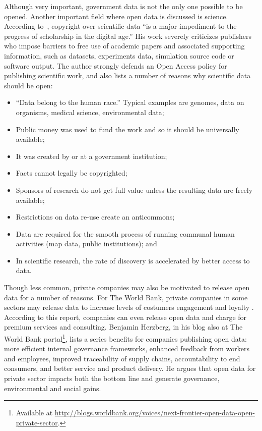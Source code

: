 Although very important, government data is not the only one possible to be opened.
Another important field where open data is discussed is science.
According to~, copyright over scientific data ``is a major impediment to the progress of scholarship in the digital age.''
His work severely criticizes publishers who impose barriers to free use of academic papers and associated supporting information, such as datasets, experiments data, simulation source code or software output.
The author strongly defends an Open Access policy for publishing scientific work, and also lists a number of reasons why scientific data should be open:

\begin{itemize}
	\item  ``Data belong to the human race.'' Typical examples are genomes, data on organisms, medical science, environmental data;
	\item Public money was used to fund the work and so it should be universally available;
	\item It was created by or at a government institution;
	\item Facts cannot legally be copyrighted;
	\item Sponsors of research do not get full value unless the resulting data are freely available;
	\item Restrictions on data re-use create an anticommons;
	\item Data are required for the smooth process of running communal human activities (map data, public institutions); and
	\item In scientific research, the rate of discovery is accelerated by better access to data.
\end{itemize}

Though less common, private companies may also be motivated to release open data for a number of reasons.
For The World Bank, private companies in some sectors may release data to increase levels of costumers engagement and loyalty \cite{TheWorldBank2014}.
According to this report, companies can even release open data and charge for premium services and consulting.
Benjamin Herzberg, in his blog also at The World Bank portal\footnote{Available at \url{http://blogs.worldbank.org/voices/next-frontier-open-data-open-private-sector}.}, lists a series benefits for companies publishing open data: more efficient internal governance frameworks, enhanced feedback from workers and employees, improved traceability of supply chains, accountability to end consumers, and better service and product delivery.
He argues that open data for private sector impacts both the bottom line and generate governance, environmental and social gains.

